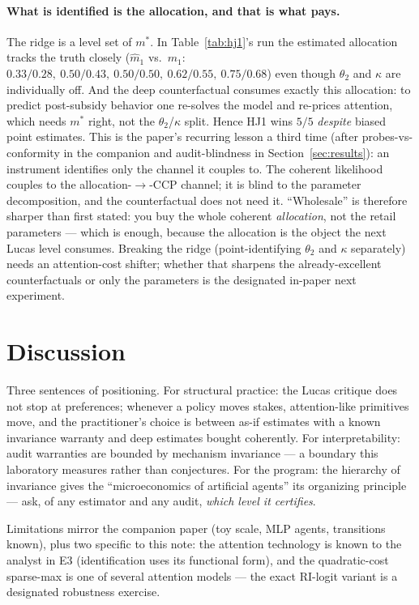 \documentclass[11pt]{article}
\newcommand{\mstar}{m^{*}}
\begin{document}
\paragraph{What is identified is the allocation, and that is what pays.}
The ridge is a level set of $\mstar$. In Table~\ref{tab:hj1}'s run the
estimated allocation tracks the truth closely ($\widehat m_1$ vs.\ $m_1$:
$0.33/0.28,\ 0.50/0.43,\ 0.50/0.50,\ 0.62/0.55,\ 0.75/0.68$) even though
$\theta_2$ and $\kappa$ are individually off. And the deep counterfactual
consumes exactly this allocation: to predict post-subsidy behavior one
re-solves the model and re-prices attention, which needs $\mstar$ right, not
the $\theta_2$/$\kappa$ split. Hence HJ1 wins $5/5$ \emph{despite} biased
point estimates. This is the paper's recurring lesson a third time (after
probes-vs-conformity in the companion and audit-blindness in
Section~\ref{sec:results}): an instrument identifies only the channel it
couples to. The coherent likelihood couples to the allocation-$\to$-CCP
channel; it is blind to the parameter decomposition, and the counterfactual
does not need it. ``Wholesale'' is therefore sharper than first stated: you
buy the whole coherent \emph{allocation}, not the retail parameters ---
which is enough, because the allocation is the object the next Lucas level
consumes. Breaking the ridge (point-identifying $\theta_2$ and $\kappa$
separately) needs an attention-cost shifter; whether that sharpens the
already-excellent counterfactuals or only the parameters is the designated
in-paper next experiment.

\section{Discussion}\label{sec:discussion}
Three sentences of positioning. For structural practice: the Lucas critique
does not stop at preferences; whenever a policy moves stakes, attention-like
primitives move, and the practitioner's choice is between as-if estimates
with a known invariance warranty and deep estimates bought coherently. For
interpretability: audit warranties are bounded by mechanism invariance ---
a boundary this laboratory measures rather than conjectures. For the
program: the hierarchy of invariance gives the ``microeconomics of
artificial agents'' its organizing principle --- ask, of any estimator and
any audit, \emph{which level it certifies}.

Limitations mirror the companion paper (toy scale, MLP agents, transitions
known), plus two specific to this note: the attention technology is known
to the analyst in E3 (identification uses its functional form), and the
quadratic-cost sparse-max is one of several attention models --- the exact
RI-logit variant is a designated robustness exercise.
\end{document}
